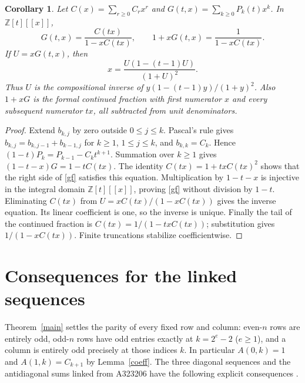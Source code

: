 \documentclass[11pt]{article}
\newtheorem{corollary}{Corollary}
\newcommand{\ZZ}{\mathbb Z}
\begin{document}
\begin{corollary}\label{generating}
Let $C(x)=\sum_{r\ge0}C_rx^r$ and
$G(t,x)=\sum_{k\ge0}P_k(t)x^k$. In $\ZZ[t][[x]]$,
\begin{equation}
 G(t,x)=\frac{C(tx)}{1-xC(tx)},\qquad
 1+xG(t,x)=\frac1{1-xC(tx)}.\label{gf}
\end{equation}
If $U=xG(t,x)$, then
\[
 x=\frac{U(1-(t-1)U)}{(1+U)^2}.
\]
Thus $U$ is the compositional inverse of
$y(1-(t-1)y)/(1+y)^2$. Also $1+xG$ is the formal continued fraction
with first numerator $x$ and every subsequent numerator $tx$,
all subtracted from unit denominators.
\end{corollary}
\begin{proof}
Extend $b_{k,j}$ by zero outside $0\le j\le k$. Pascal's rule gives
$b_{k,j}=b_{k,j-1}+b_{k-1,j}$ for $k\ge1$, $1\le j\le k$,
and $b_{k,k}=C_k$. Hence
$(1-t)P_k=P_{k-1}-C_kt^{k+1}$. Summation over $k\ge1$ gives
$(1-t-x)G=1-tC(tx)$.
The identity $C(tx)=1+txC(tx)^2$ shows that the right side of
\eqref{gf} satisfies this equation. Multiplication by $1-t-x$ is
injective in the integral domain $\ZZ[t][[x]]$, proving \eqref{gf}
without division by $1-t$. Eliminating $C(tx)$ from
$U=xC(tx)/(1-xC(tx))$ gives the inverse equation. Its linear
coefficient is one, so the inverse is unique. Finally the tail of the
continued fraction is $C(tx)=1/(1-txC(tx))$; substitution gives
$1/(1-xC(tx))$. Finite truncations stabilize coefficientwise.
\end{proof}

\section{Consequences for the linked sequences}
Theorem~\ref{main} settles the parity of every fixed row and column:
even-$n$ rows are entirely odd, odd-$n$ rows have odd entries exactly at
$k=2^e-2$ ($e\ge1$), and a column is entirely odd precisely at those
indices $k$. In particular $A(0,k)=1$ and $A(1,k)=C_{k+1}$ by
Lemma~\ref{coeff}. The three diagonal sequences and the antidiagonal
sums linked from A323206 have the following explicit consequences
\cite{diagonals,sums}.
\end{document}
